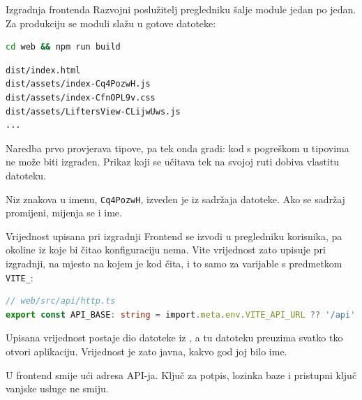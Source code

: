 \begin{frame}[fragile]{Izgradnja frontenda}
Razvojni poslužitelj pregledniku šalje module jedan po jedan. Za produkciju se moduli slažu u gotove datoteke:

\begin{lstlisting}[language=bash]
cd web && npm run build
\end{lstlisting}

\begin{lstlisting}
dist/index.html
dist/assets/index-Cq4PozwH.js
dist/assets/index-CfnOPL9v.css
dist/assets/LiftersView-CLijwUws.js
...
\end{lstlisting}

\vspace{0.2em}
Naredba prvo provjerava tipove, pa tek onda gradi: kod s pogreškom u tipovima ne može biti izgrađen. Prikaz koji se učitava tek na svojoj ruti dobiva vlastitu datoteku.

\vspace{0.3em}
Niz znakova u imenu, \texttt{Cq4PozwH}, izveden je iz sadržaja datoteke. Ako se sadržaj promijeni, mijenja se i ime.
\end{frame}

\begin{frame}[fragile]{Vrijednost upisana pri izgradnji}
Frontend se izvodi u pregledniku korisnika, pa okoline iz koje bi čitao konfiguraciju nema. Vite vrijednost zato upisuje pri izgradnji, na mjesto na kojem je kod čita, i to samo za varijable s predmetkom \texttt{VITE\_}:

\begin{lstlisting}[language=typescript]
// web/src/api/http.ts
export const API_BASE: string = import.meta.env.VITE_API_URL ?? '/api'
\end{lstlisting}

\vspace{0.4em}
Upisana vrijednost postaje dio datoteke iz , a tu datoteku preuzima svatko tko otvori aplikaciju. Vrijednost je zato javna, kakvo god joj bilo ime.

\vspace{0.4em}
U frontend smije ući adresa API-ja. Ključ za potpis, lozinka baze i pristupni ključ vanjske usluge ne smiju.
\end{frame}

